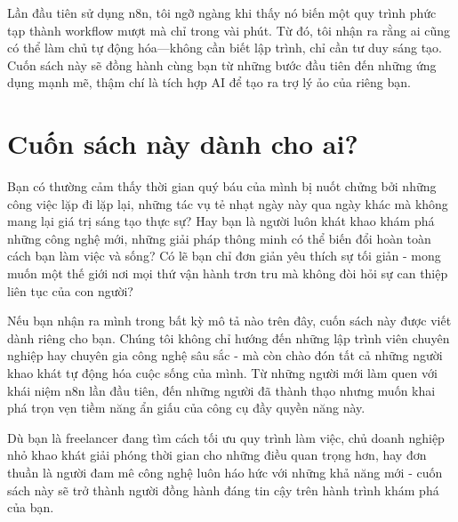 \documentclass[a4paper,12pt,oneside]{book}
\begin{document}
Lần đầu tiên sử dụng n8n, tôi ngỡ ngàng khi thấy nó biến một quy trình phức tạp thành workflow mượt mà chỉ trong vài phút. Từ đó, tôi nhận ra rằng ai cũng có thể làm chủ tự động hóa—không cần biết lập trình, chỉ cần tư duy sáng tạo. Cuốn sách này sẽ đồng hành cùng bạn từ những bước đầu tiên đến những ứng dụng mạnh mẽ, thậm chí là tích hợp AI để tạo ra trợ lý ảo của riêng bạn.

\newpage

\section*{Cuốn sách này dành cho ai?}
\begin{center}
    
\end{center}

Bạn có thường cảm thấy thời gian quý báu của mình bị nuốt chửng bởi những công việc lặp đi lặp lại, những tác vụ tẻ nhạt ngày này qua ngày khác mà không mang lại giá trị sáng tạo thực sự? Hay bạn là người luôn khát khao khám phá những công nghệ mới, những giải pháp thông minh có thể biến đổi hoàn toàn cách bạn làm việc và sống? Có lẽ bạn chỉ đơn giản yêu thích sự tối giản - mong muốn một thế giới nơi mọi thứ vận hành trơn tru mà không đòi hỏi sự can thiệp liên tục của con người?

Nếu bạn nhận ra mình trong bất kỳ mô tả nào trên đây, cuốn sách này được viết dành riêng cho bạn.
Chúng tôi không chỉ hướng đến những lập trình viên chuyên nghiệp hay chuyên gia công nghệ sâu sắc - mà còn chào đón tất cả những người khao khát tự động hóa cuộc sống của mình. Từ những người mới làm quen với khái niệm n8n lần đầu tiên, đến những người đã thành thạo nhưng muốn khai phá trọn vẹn tiềm năng ẩn giấu của công cụ đầy quyền năng này.

Dù bạn là freelancer đang tìm cách tối ưu quy trình làm việc, chủ doanh nghiệp nhỏ khao khát giải phóng thời gian cho những điều quan trọng hơn, hay đơn thuần là người đam mê công nghệ luôn háo hức với những khả năng mới - cuốn sách này sẽ trở thành người đồng hành đáng tin cậy trên hành trình khám phá của bạn.
\end{document}
